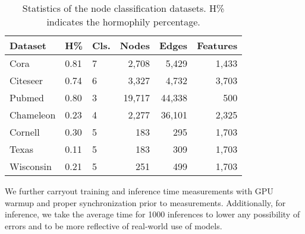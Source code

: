 \documentclass{article}
\begin{document}
\begin{table}[h]
    \caption{Statistics of the node classification datasets. H\% indicates the hormophily percentage.}
    \begin{tabular}{lllrrr}
    \toprule
    Dataset   & H\% & Cls. & Nodes  & Edges   & Features \\ \midrule
    Cora      & 0.81       & 7       & 2,708  & 5,429   & 1,433    \\
    Citeseer  & 0.74       & 6       & 3,327  & 4,732   & 3,703    \\
    Pubmed    & 0.80       & 3       & 19,717 & 44,338  & 500      \\
    Chameleon & 0.23       & 4       & 2,277  & 36,101  & 2,325    \\
    Cornell   & 0.30       & 5       & 183    & 295     & 1,703    \\
    Texas     & 0.11       & 5       & 183    & 309     & 1,703    \\
    Wisconsin & 0.21       & 5       & 251    & 499     & 1,703    \\ \bottomrule
\end{tabular}
    \label{table_dataset}
\end{table}

We further carryout training and inference time measurements with GPU warmup and proper synchronization prior to measurements. Additionally, for inference, we take the average time for 1000 inferences to lower any possibility of errors  and to be more reflective of real-world use of models.
\end{document}
